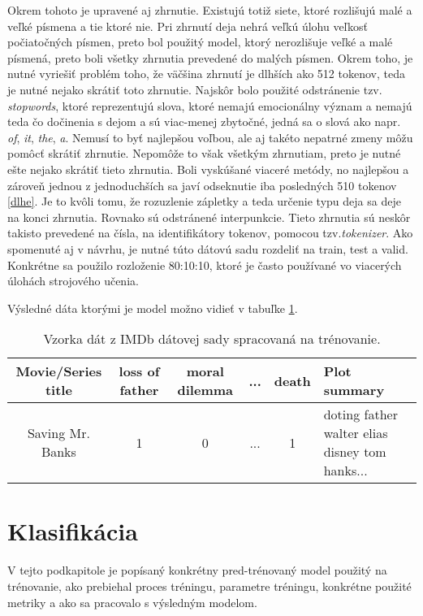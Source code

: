 Okrem tohoto je upravené aj zhrnutie. Existujú totiž siete, ktoré rozlišujú malé a veľké písmena a tie ktoré nie. Pri zhrnutí deja nehrá veľkú úlohu veľkosť počiatočných písmen, preto bol použitý model, ktorý nerozlišuje veľké a malé písmená, preto boli všetky zhrnutia prevedené do malých písmen. Okrem toho, je nutné vyriešiť problém toho, že väčšina zhrnutí je dlhších ako 512 tokenov, teda je nutné nejako skrátiť toto zhrnutie. Najskôr bolo použité odstránenie tzv. \textit{stopwords}, ktoré reprezentujú slova, ktoré nemajú emocionálny význam a  nemajú teda čo dočinenia s dejom a sú viac-menej zbytočné, jedná sa o slová ako napr. \textit{of}, \textit{it}, \textit{the}, \textit{a}. Nemusí to byť najlepšou voľbou, ale aj takéto nepatrné zmeny môžu pomôcť skrátiť zhrnutie. Nepomôže to však všetkým zhrnutiam, preto je nutné ešte nejako skrátiť tieto zhrnutia. Boli vyskúšané viaceré metódy, no najlepšou a zároveň jednou z jednoduchších sa javí odseknutie iba posledných 510 tokenov \ref{dlhe}. Je to kvôli tomu, že rozuzlenie zápletky a teda určenie typu deja sa deje na konci zhrnutia. Rovnako sú odstránené interpunkcie. Tieto zhrnutia sú neskôr takisto prevedené na čísla, na identifikátory tokenov, pomocou tzv.\textit{tokenizer}. Ako spomenuté aj v návrhu, je nutné túto dátovú sadu rozdeliť na train, test a valid. Konkrétne sa použilo rozloženie 80:10:10, ktoré je často používané vo viacerých úlohách strojového učenia.

Výsledné dáta ktorými je model  možno vidieť v tabuľke \ref{spracovane}.

\begin{table}[hbt]
\centering
\caption{Vzorka dát z IMDb dátovej sady spracovaná na trénovanie.}
\label{spracovane}
\begin{tabular}{|c|c|c|c|c|
>{\centering\arraybackslash}m{7em}|}
\hline
Movie/Series title & loss of father & moral dilemma & ... & death  & Plot summary \\
\hline
Saving Mr. Banks & 1 & 0  & ... & 1 &  doting father walter elias disney tom hanks...\\ 
\hline

\end{tabular}
\end{table}


\section{Klasifikácia}

V tejto podkapitole je popísaný konkrétny pred-trénovaný model použitý na trénovanie, ako prebiehal proces tréningu, parametre tréningu, konkrétne použité metriky a ako sa pracovalo s výsledným modelom. 

